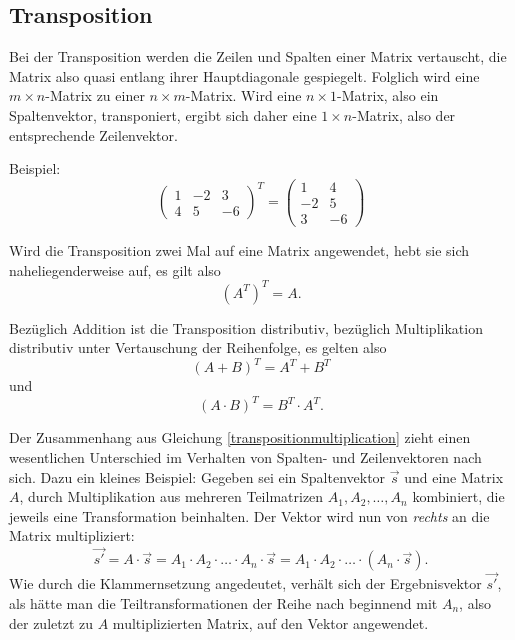 \subsection{Transposition}
\label{transposition}
Bei der Transposition werden die Zeilen und Spalten einer Matrix vertauscht, die Matrix also quasi entlang ihrer Hauptdiagonale gespiegelt. Folglich wird eine $m \times n$-Matrix zu einer $n \times m$-Matrix. Wird eine $n \times 1$-Matrix, also ein Spaltenvektor, transponiert, ergibt sich daher eine $1 \times n$-Matrix, also der entsprechende Zeilenvektor.

Beispiel:
\begin{equation}
  \begin{pmatrix}
    1 & -2 & 3 \\
    4 & 5 & -6
  \end{pmatrix}^T
  =
  \begin{pmatrix}
    1 & 4 \\
    -2 & 5 \\
    3 & -6
  \end{pmatrix}
\end{equation}

Wird die Transposition zwei Mal auf eine Matrix angewendet, hebt sie sich naheliegenderweise auf, es gilt also
\begin{equation}
 (A^T)^T = A.
\end{equation}

Bezüglich Addition ist die Transposition distributiv, bezüglich Multiplikation distributiv unter Vertauschung der Reihenfolge, es gelten also
\begin{equation}
 (A + B)^T = A^T + B^T
\end{equation}
und
\begin{equation}
\label{transpositionmultiplication}
 (A \cdot B)^T = B^T \cdot A^T.
\end{equation}

Der Zusammenhang aus Gleichung \ref{transpositionmultiplication} zieht einen wesentlichen Unterschied im Verhalten von Spalten- und Zeilenvektoren nach sich. Dazu ein kleines Beispiel: Gegeben sei ein Spaltenvektor $\vec s$ und eine Matrix $A$, durch Multiplikation aus mehreren Teilmatrizen $A_1, A_2, \dots, A_n$ kombiniert, die jeweils eine Transformation beinhalten. Der Vektor wird nun von \emph{rechts} an die Matrix multipliziert:
\begin{equation}
 \vec{s'} = A \cdot \vec{s} = A_1 \cdot A_2 \cdot \ldots \cdot A_n \cdot \vec{s} = A_1 \cdot A_2 \cdot \ldots \cdot \left( A_n \cdot \vec{s} \right).
\end{equation}
Wie durch die Klammernsetzung angedeutet, verhält sich der Ergebnisvektor $\vec{s'}$, als hätte man die Teiltransformationen der Reihe nach beginnend mit $A_n$, also der zuletzt zu $A$ multiplizierten Matrix, auf den Vektor angewendet.


